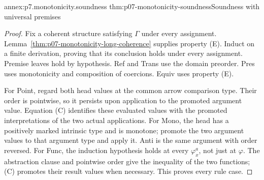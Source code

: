\begin{annexitem}{annex:p7.monotonicity.soundness}
 {thm:p07-monotonicity-soundness}{Soundness with universal premises}
\begin{proof}
Fix a coherent structure satisfying \(\Gamma\) under every assignment.
Lemma~\ref{thm:p07-monotonicity-long-coherence} supplies property (E).
Induct on a finite derivation, proving that its conclusion holds under
every assignment. Premise leaves hold by hypothesis.
Ref and Trans use the domain preorder. Pres uses monotonicity and
composition of coercions. Equiv uses
property (E).

For Point, regard both head values at the common arrow comparison type.
Their order is pointwise, so it persists upon application to the promoted
argument value. Equation (C) identifies these evaluated values with the
promoted interpretations of the two actual applications.
For Mono, the head has a positively marked intrinsic type and is
monotone; promote the two argument values to that argument type and apply
it. Anti is the same argument with order reversed.
For Func, the induction hypothesis holds at every
\(\varphi_x^a\), not just at \(\varphi\).
The abstraction clause and pointwise order give the inequality of the two
functions; (C) promotes their result values when necessary.
This proves every rule case.
\end{proof}
\end{annexitem}

